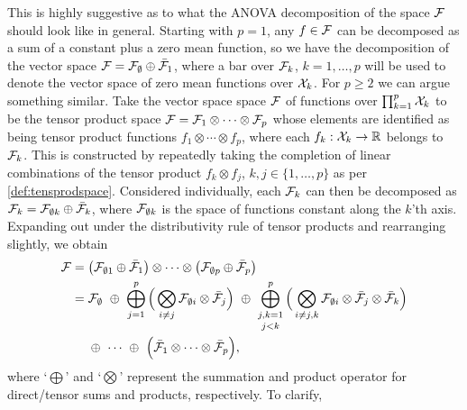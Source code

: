 This is highly suggestive as to what the ANOVA decomposition of the space ${\mathcal F}$ should look like in general.
Starting with $p=1$, any $f \in {\mathcal F}$ can be decomposed as a sum of a constant plus a zero mean function, so we have the
decomposition of the vector space ${\mathcal F} = {\mathcal F}_\emptyset \oplus \bar{{\mathcal F}}_1$, where 
a bar over ${\mathcal F}_k$, $k=1,\dots,p$ will be used to denote the vector space of zero mean functions over ${\mathcal X}_k$.
For $p\geq 2$ we can argue something similar.
Take the vector space space ${\mathcal F}$ of functions over $\prod_{k=1}^p {\mathcal X}_k$ to be the tensor product space ${\mathcal F} = {\mathcal F}_1 \otimes \cdots \otimes {\mathcal F}_p$ whose elements are identified as being tensor product functions $f_1 \otimes\cdots\otimes f_p$, where each $f_k:{\mathcal X}_k\to\mathbb{R}$ belongs to ${\mathcal F}_k$.
This is constructed by repeatedly taking the completion of linear combinations of the tensor product $f_k \otimes f_j$, $k,j\in\{1,\dots,p\}$ as per \cref{def:tensprodspace}.
Considered individually, each ${\mathcal F}_k$ can then be decomposed as ${\mathcal F}_k = {\mathcal F}_{\emptyset k} \oplus \bar{{\mathcal F}}_k$, where ${\mathcal F}_{\emptyset k}$ is the space of functions constant along the $k$'th axis.
Expanding out under the distributivity rule of tensor products and rearranging slightly, we obtain
\begin{align}
  \cF ={}& \big( \cF_{\emptyset 1} \oplus \bar\cF_1 \big) \otimes \cdots \otimes 
  \big( \cF_{\emptyset p} \oplus \bar\cF_p \big) \nonumber \\
  ={}& \cF_{\emptyset}
  \ \oplus \
  \bigoplus_{j=1}^p 
  \Big( \bigotimes_{i\neq j}\cF_{\emptyset i} \otimes \bar\cF_j \Big) 
  \ \oplus \
  \mathop{\bigoplus_{j,k=1}^p}_{j<k} 
  \Big( \bigotimes_{i\neq j,k}\cF_{\emptyset i} \otimes \bar\cF_j \otimes \bar\cF_k \Big)
  \label{eq:funcanovaspace} \\
  & \oplus \ 
  \cdots 
  \ \oplus \ 
  \Big( \bar\cF_1 \otimes \cdots \otimes \bar\cF_p \Big), \nonumber
\end{align}
where `$\bigoplus$' and `$\bigotimes$' represent the summation and product operator for direct/tensor sums and products, respectively. 
To clarify,
